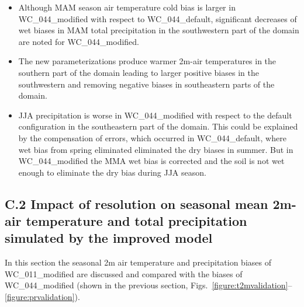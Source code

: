 \documentclass[a0b,landscape]{a0poster}
\begin{document}
\begin{multicols*}{4}
\begin{itemize}
  \item Although MAM season air temperature cold bias is larger in WC\_044\_modified with respect to WC\_044\_default,
  significant decreases of wet biases in MAM total precipitation in the southwestern part of the domain are noted for  WC\_044\_modified.

  \item The new parameterizations produce warmer 2m-air temperatures in the southern part
  of the domain leading to larger positive biases in the southwestern and removing negative biases in
  southeastern parts of the domain.
  \item JJA precipitation is worse in WC\_044\_modified with respect to
  the default configuration in the southeastern part of the domain. This could be explained by the compensation of errors, which
  occurred in WC\_044\_default, where wet bias from spring eliminated eliminated the dry biases in summer. But in WC\_044\_modified the
  MMA wet bias is corrected and the soil is not wet enough to eliminate the dry bias during JJA season.
\end{itemize}

\subsection*{C.2 Impact of resolution on seasonal mean 2m-air temperature and total precipitation simulated by the improved model}
\noindent
\begin{minipage}[t]{\linewidth}
In this section the seasonal 2m air temperature and precipitation biases of
WC\_011\_modified are discussed and compared with the biases of
WC\_044\_modified (shown in the previous section,
Figs.~\ref{figure:t2mvalidation}--\ref{figure:prvalidation}).
\begin{center}
\end{center}
\end{minipage}



\end{multicols*}
\end{document}
